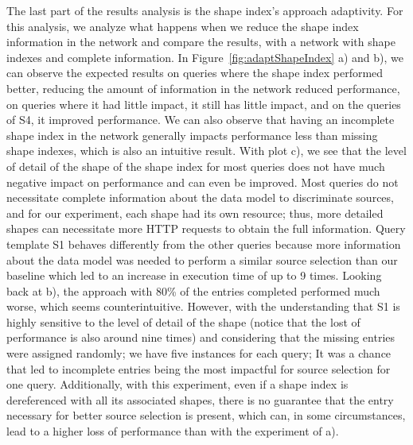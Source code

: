 The last part of the results analysis is the shape index's approach adaptivity.
For this analysis, we analyze what happens when we reduce the shape index information in the network and compare the results,
with a network with shape indexes and complete information.
In Figure~\ref{fig:adaptShapeIndex} a) and b), we can observe the expected results on queries 
where the shape index performed better, reducing the amount of information in the network reduced performance,
on queries where it had little impact, it still has little impact, and on the queries of S4, it improved performance.
We can also observe that having an incomplete shape index in the network generally impacts performance less than
missing shape indexes, which is also an intuitive result.
With plot c), we see that the level of detail of the shape of the shape index for most queries does not have much negative impact on performance and can even be improved.
Most queries do not necessitate complete information about the data model to discriminate sources, and for our experiment, each shape
had its own resource; thus, more detailed shapes can necessitate more HTTP requests to obtain the full information.
Query template S1 behaves differently from the other queries because more information about the data model was needed to perform a similar source selection than our baseline
which led to an increase in execution time of up to 9 times.
Looking back at b), the approach with 80\% of the entries completed performed much worse, which seems counterintuitive.
However, with the understanding that S1 is highly sensitive to the level of detail of the shape (notice that the lost of performance is also around nine times) and considering that 
the missing entries were assigned randomly;
we have five instances for each query;
It was a chance that led to incomplete entries being the most impactful for source selection for one query.
Additionally, with this experiment, even if a shape index is dereferenced with all its associated shapes, there is no guarantee that
the entry necessary for better source selection is present, which can, in some circumstances, lead to a higher loss of performance than
with the experiment of a).
